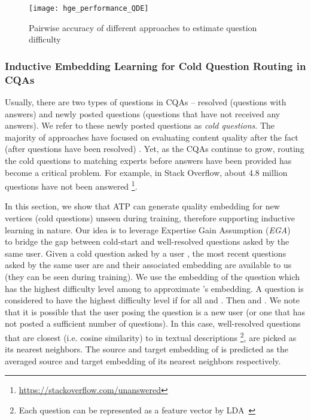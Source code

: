 \documentclass[letterpaper]{article} \usepackage{aaai19}  \usepackage{times}  \usepackage{helvet}  \usepackage{courier}  \usepackage{url}  \usepackage{graphicx}  \usepackage{booktabs} \usepackage{xcolor}
\begin{document}
\begin{figure}[t!]
    \centering
    \small
    \texttt{[image: hge\_performance\_QDE]}
    \caption{Pairwise accuracy  of different approaches to estimate question difficulty} 
    \label{fig:hge_performance_qde}
\end{figure}


\subsubsection{Inductive Embedding Learning for Cold Question Routing in CQAs}

Usually, there are two types of questions in CQAs -- resolved (questions with answers) and newly posted questions (questions that have not received any answers). We refer to these newly posted questions as {\em cold questions}. The majority of approaches have focused on evaluating content quality after the fact (after questions have been resolved) \cite{Yang2013CQArank}. Yet, as the CQAs continue to grow, routing the cold questions to matching experts before answers have been provided has become a critical problem. For example, in Stack Overflow, about 4.8 million questions have not been answered \footnote{\url{https://stackoverflow.com/unanswered}}.

In this section, we show that ATP can generate quality embedding for new vertices (cold questions) unseen during training, therefore supporting inductive learning in nature. Our idea is to leverage Expertise Gain Assumption ({\em EGA}) ~\cite{QDEE2018} to bridge the gap between cold-start and well-resolved questions asked by the same user. Given a cold question  asked by a user , the most recent  questions asked by the same user  are  and their associated embedding are available to us (they can be seen during training). We use the embedding of the question which has the highest difficulty level among  to approximate 's embedding. A question  is considered to have the highest difficulty level if  for all  and . Then  and  . We note that it is possible that the user posing the question is a new user (or one that has not posted a sufficient number of questions). In this case,  well-resolved questions that are closest (i.e. cosine similarity) to  in textual descriptions \footnote{Each question can be represented as a feature vector by LDA~\cite{Ji2012LDA}}, are picked as its nearest neighbors. The source and target embedding of  is predicted as the averaged source and target embedding of its nearest neighbors respectively. 
\end{document}
